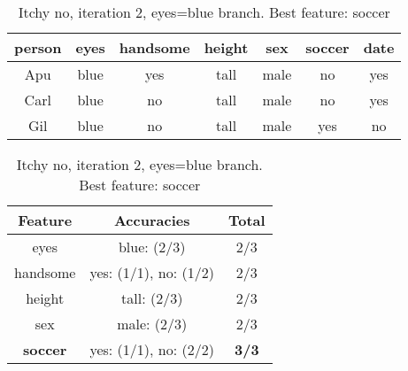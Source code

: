 \begin{table}[h!]
  \centering
  \begin{tabular}{cccccc|c}
    \toprule
    person      & eyes  & handsome & height & sex    & soccer & date\\
    \midrule
    Apu         & blue  & yes      & tall   & male   & no     & yes \\
    Carl        & blue  & no       & tall   & male   & no     & yes \\
    Gil         & blue  & no       & tall   & male   & yes    & no  \\
    \bottomrule
  \end{tabular}

  \vspace{.5cm}

  \begin{tabular}{ccc}
    \toprule
    Feature         & Accuracies                              & Total\\
    \midrule
    eyes            & blue: (2/3)                             & 2/3\\
    handsome        & yes: (1/1), no: (1/2)                   & 2/3\\
    height          & tall: (2/3)                             & 2/3\\
    sex             & male: (2/3)                             & 2/3\\
    \textbf{soccer} & yes: (1/1), no: (2/2)                   & \textbf{3/3}\\
    \bottomrule
  \end{tabular}
  \caption*{Itchy no, iteration 2, eyes=blue branch. Best feature: soccer}
\end{table}

